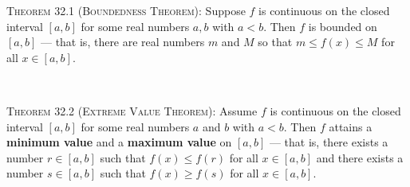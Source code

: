 \documentclass[12pt]{amsart}
\numberwithin{equation}{section}
\theoremstyle{plain} %
\theoremstyle{definition}
\theoremstyle{remark}
\begin{document}
\begin{framed} 
 \noindent \textsc{Theorem 32.1 (Boundedness Theorem):} Suppose $f$ is continuous on the closed interval $[a,b]$ for some real numbers $a,b$ with $a < b$. Then $f$ is bounded on $[a,b]$ --- that is,
  there are real numbers $m$ and $M$ so that $m \leq f(x) \leq M$ for all $x \in [a,b]$.
  
  \
  
  \noindent  \textsc{Theorem 32.2 (Extreme Value Theorem):} Assume $f$ is continuous on the closed interval $[a,b]$ for some real numbers $a$ and $b$ with $a < b$.
  Then $f$ attains a \textbf{minimum value} and a \textbf{maximum value} on $[a,b]$ ---
that is, there exists a number $r \in [a,b]$ such that $f(x) \leq f(r)$ for all $x \in [a,b]$ and
there exists a number $s \in [a,b]$ such that $f(x) \geq f(s)$ for all $x \in [a,b]$.
\end{framed}
\end{document}
